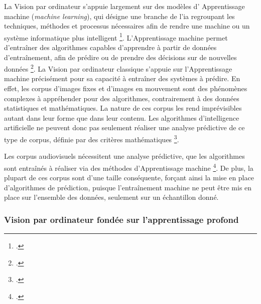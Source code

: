 La \gls{Vision par ordinateur} s’appuie largement sur des modèles d' \gls{Apprentissage machine} (\textit{machine learning}), qui désigne une branche de l'\gls{ia} regroupant les techniques, méthodes et processus nécessaires afin de rendre une machine ou un système informatique plus intelligent \footcite{zotero-item-584}. L'\gls{Apprentissage machine} permet d’entraîner des algorithmes capables d’apprendre à partir de données d’entraînement, afin de prédire ou de prendre des décisions sur de nouvelles données \footcite{zotero-item-702}. La \gls{Vision par ordinateur} classique s’appuie sur l’\gls{Apprentissage machine} précisément pour sa capacité à entraîner des systèmes à prédire. En effet, les corpus d’images fixes et d’images en mouvement sont des phénomènes complexes à appréhender pour des algorithmes, contrairement à des données statistiques et mathématiques. La nature de ces corpus les rend imprévisibles autant dans leur forme que dans leur contenu. Les algorithmes d’intelligence artificielle ne peuvent donc pas seulement réaliser une analyse prédictive de ce type de corpus, définie par des critères mathématiques \footcite{mahony2020}. 

Les corpus audiovisuels nécessitent une analyse prédictive, que les algorithmes sont entraînés à réaliser via des méthodes d'\gls{Apprentissage machine} \footcite{mahony2020}. De plus, la plupart de ces corpus sont d’une taille conséquente, forçant ainsi la mise en place d'algorithmes de prédiction, puisque l’entraînement machine ne peut être mis en place sur l’ensemble des données, seulement sur un échantillon donné. 

\subsubsection{Vision par ordinateur fondée sur l'apprentissage profond}

